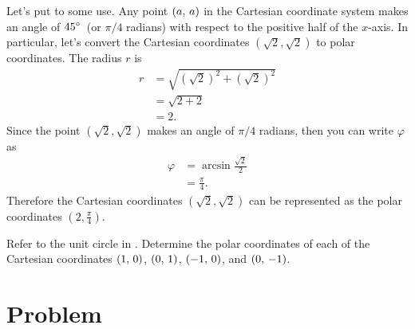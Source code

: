 \documentclass[a4paper,oneside,12pt]{article}
\begin{document}
Let's put  to some
use.  Any point $\left\lparen{a},\, {a}\right\rparen$ in the Cartesian coordinate system
makes an angle of ${45}^{\circ}$~(or $\pi / 4$ radians) with respect to
the positive half of the $x$-axis.  In particular, let's convert the
Cartesian coordinates $(\sqrt{2}\comma \sqrt{2})$ to polar
coordinates.  The radius $r$ is
\begin{align*}
r
&=
\sqrt{
  (\sqrt{2})^2 + (\sqrt{2})^2
} \\[4pt]
&=
\sqrt{2 + 2} \\[4pt]
&=
2.
\end{align*}
Since the point $(\sqrt{2}\comma \sqrt{2})$ makes an angle of
$\pi / 4$ radians, then you can write $\varphi$ as
\begin{align*}
\varphi
&=
\arcsin\frac{\sqrt{2}}{2} \\[4pt]
&=
\frac{\pi}{4}.
\end{align*}
Therefore the Cartesian coordinates $(\sqrt{2}\comma \sqrt{2})$ can be
represented as the polar coordinates $(2\comma \frac{\pi}{4})$.

\begin{exercise}
Refer to the unit circle in .
Determine the polar coordinates of each of the Cartesian coordinates
$\left\lparen{1},\, {0}\right\rparen$, $\left\lparen{0},\, {1}\right\rparen$, $\left\lparen{-1},\, {0}\right\rparen$, and $\left\lparen{0},\, {-1}\right\rparen$.
\end{exercise}




\section*{Problem}
\end{document}
